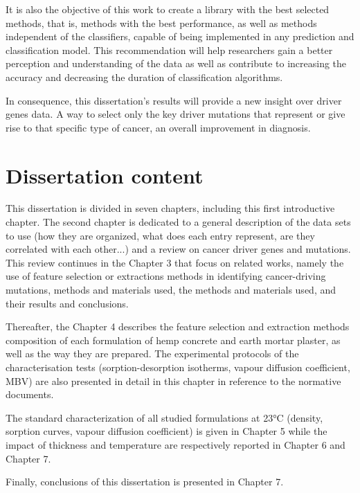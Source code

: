 It is also the objective of this work to create a library with the best selected methods, that is, methods with the best performance, as well as methods independent of the classifiers, capable of being implemented in any prediction and classification model. This recommendation will help researchers gain a better perception and understanding of the data as well as contribute to increasing the accuracy and decreasing the duration of classification algorithms.

In consequence, this dissertation’s results will provide a new insight over driver genes data. A way to select only the key driver mutations that represent or give rise to that specific type of cancer, an overall improvement in diagnosis.


 
\section{Dissertation content}
\label{dissertation_content}
\hspace{10px}This dissertation is divided in seven chapters, including this first introductive chapter. The second chapter is dedicated to a general description of the data sets to use (how they are organized, what does each entry represent, are they correlated with each other...) and a review on cancer driver genes and mutations. This review continues in the Chapter 3 that focus on related works, namely the use of feature selection or extractions methods in identifying cancer-driving mutations, methods and materials used, the methods and materials used, and their results and conclusions.

Thereafter, the Chapter 4 describes the feature selection and extraction methods composition of each formulation of hemp concrete and earth mortar plaster, as well as the way they are prepared. The experimental protocols of the characterisation tests (sorption-desorption isotherms, vapour diffusion coefficient, MBV) are also presented in detail in this chapter in reference to the normative documents. 


The standard characterization of all studied formulations at 23°C (density, sorption curves, vapour diffusion coefficient) is given in Chapter 5 while the impact of thickness and temperature are respectively reported in Chapter 6 and Chapter 7.


Finally, conclusions of this dissertation is presented in Chapter 7.